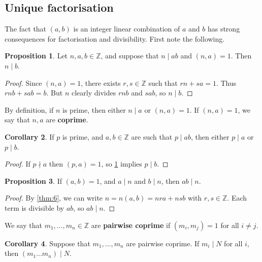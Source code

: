 \documentclass{article}
\newcommand{\Z}{\mathbb{Z}}
\newcommand{\rb}[1]{\left( #1 \right)}
\theoremstyle{definition}\newtheorem{definition}{Definition}
\theoremstyle{definition}\newtheorem*{remark}{Remark}
\theoremstyle{definition}\newtheorem*{example}{Example}
\theoremstyle{definition}\newtheorem*{note}{Note}
\newtheorem{proposition}[definition]{Proposition}
\newtheorem{corollary}[definition]{Corollary}
\begin{document}
\subsection{Unique factorisation}

The fact that $ \rb{a, b} $ is an integer linear combination of $ a $ and $ b $ has strong consequences for factorisation and divisibility. First note the following.

\begin{proposition}
\label{prop:7}
Let $ n, a, b \in \Z $, and suppose that $ n \mid ab $ and $ \rb{n, a} = 1 $. Then $ n \mid b $.
\end{proposition}

\begin{proof}
Since $ \rb{n, a} = 1 $, there exists $ r, s \in \Z $ such that $ rn + sa = 1 $. Thus $ rnb + sab = b $. But $ n $ clearly divides $ rnb $ and $ sab $, so $ n \mid b $.
\end{proof}

By definition, if $ n $ is prime, then either $ n \mid a $ or $ \rb{n, a} = 1 $. If $ \rb{n, a} = 1 $, we say that $ n, a $ are \textbf{coprime}.


\begin{corollary}
\label{cor:8}
If $ p $ is prime, and $ a, b \in \Z $ are such that $ p \mid ab $, then either $ p \mid a $ or $ p \mid b $.
\end{corollary}

\begin{proof}
If $ p \nmid a $ then $ \rb{p, a} = 1 $, so \ref{prop:7} implies $ p \mid b $.
\end{proof}

\begin{proposition}
\label{prop:9}
If $ \rb{a, b} = 1 $, and $ a \mid n $ and $ b \mid n $, then $ ab \mid n $.
\end{proposition}

\begin{proof}
By \ref{thm:6}, we can write $ n = n\rb{a, b} = nra + nsb $ with $ r, s \in \Z $. Each term is divisible by $ ab $, so $ ab \mid n $.
\end{proof}

We say that $ m_1, \dots, m_n \in \Z $ are \textbf{pairwise coprime} if $ \rb{m_i, m_j} = 1 $ for all $ i \ne j $.

\begin{corollary}
\label{cor:10}
Suppose that $ m_1, \dots, m_n $ are pairwise coprime. If $ m_i \mid N $ for all $ i $, then $ \rb{m_1 \dots m_n} \mid N $.
\end{corollary}
\end{document}
